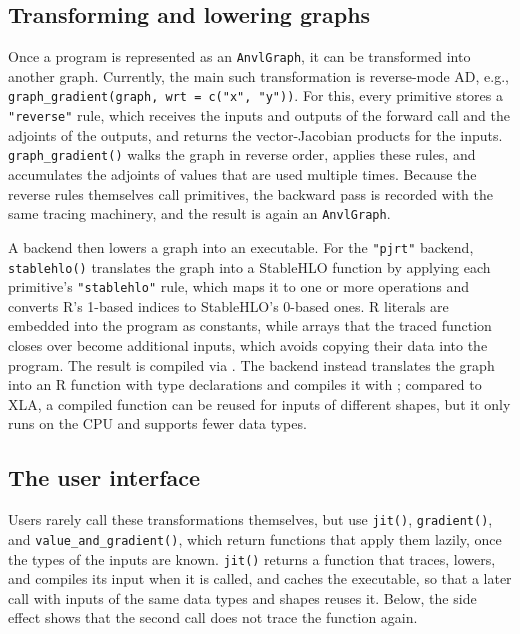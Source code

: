 \subsection{Transforming and lowering graphs}\label{transforming-and-lowering-graphs}

Once a program is represented as an \texttt{AnvlGraph}, it can be transformed into another graph.
Currently, the main such transformation is reverse-mode AD, e.g., \texttt{graph\_gradient(graph,\ wrt\ =\ c("x",\ "y"))}.
For this, every primitive stores a \texttt{"reverse"} rule, which receives the inputs and outputs of the forward call and the adjoints of the outputs, and returns the vector-Jacobian products for the inputs.
\texttt{graph\_gradient()} walks the graph in reverse order, applies these rules, and accumulates the adjoints of values that are used multiple times.
Because the reverse rules themselves call primitives, the backward pass is recorded with the same tracing machinery, and the result is again an \texttt{AnvlGraph}.

A backend then lowers a graph into an executable.
For the \texttt{"pjrt"} backend, \texttt{stablehlo()} translates the graph into a StableHLO function by applying each primitive's \texttt{"stablehlo"} rule, which maps it to one or more  operations and converts R's 1-based indices to StableHLO's 0-based ones.
R literals are embedded into the program as constants, while arrays that the traced function closes over become additional inputs, which avoids copying their data into the program.
The result is compiled via .
The  backend instead translates the graph into an R function with type declarations and compiles it with ; compared to XLA, a compiled  function can be reused for inputs of different shapes, but it only runs on the CPU and supports fewer data types.

\subsection{The user interface}\label{the-user-interface}

Users rarely call these transformations themselves, but use \texttt{jit()}, \texttt{gradient()}, and \texttt{value\_and\_gradient()}, which return functions that apply them lazily, once the types of the inputs are known.
\texttt{jit()} returns a function that traces, lowers, and compiles its input when it is called, and caches the executable, so that a later call with inputs of the same data types and shapes reuses it.
Below, the side effect shows that the second call does not trace the function again.


